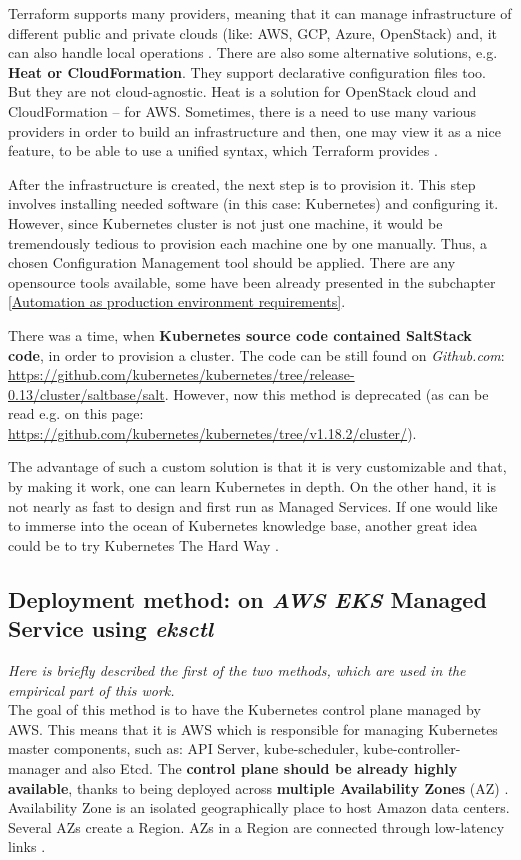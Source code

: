 Terraform supports many providers, meaning that it can manage infrastructure of different public and private clouds (like: AWS, GCP, Azure, OpenStack) and, it can also handle local operations \cite{terraform}. There are also some alternative solutions, e.g. \textbf{Heat or CloudFormation}. They support declarative configuration files too. But they are not cloud-agnostic. Heat is a solution for OpenStack cloud and CloudFormation -- for AWS. Sometimes, there is a need to use many various providers in order to build an infrastructure and then, one may view it as a nice feature, to be able to use a unified syntax, which Terraform provides \cite{terraform-vs}.

After the infrastructure is created, the next step is to provision it. This step involves installing needed software (in this case: Kubernetes) and configuring it. However, since Kubernetes cluster is not just one machine, it would be tremendously tedious to provision each machine one by one manually. Thus, a chosen Configuration Management tool should be applied. There are any opensource tools available, some have been already presented in the subchapter \ref{Automation as production environment requirements}.

There was a time, when \textbf{Kubernetes source code contained SaltStack code}, in order to provision a cluster. The code can be still found on \textit{Github.com}: \url{https://github.com/kubernetes/kubernetes/tree/release-0.13/cluster/saltbase/salt}. However, now this method is deprecated (as can be read e.g. on this page: \url{https://github.com/kubernetes/kubernetes/tree/v1.18.2/cluster/}).

The advantage of such a custom solution is that it is very customizable and that, by making it work, one can learn Kubernetes in depth. On the other hand, it is not nearly as fast to design and first run as Managed Services. If one would like to immerse into the ocean of Kubernetes knowledge base, another great idea could be to try Kubernetes The Hard Way \cite{k8s-thw}.


\subsection{Deployment method: on \textit{AWS EKS} Managed Service using \textit{eksctl}}
\textit{Here is briefly described the first of the two methods, which are used in the empirical part of this work.}
\\

The goal of this method is to have the Kubernetes control plane managed by AWS. This means that it is AWS which is responsible for managing Kubernetes master components, such as: API Server, kube-scheduler, kube-controller-manager and also Etcd. The \textbf{control plane should be already highly available}, thanks to being deployed across \textbf{multiple Availability Zones} (AZ) \cite{what-is-eks}. Availability Zone is an isolated geographically place to host Amazon data centers. Several AZs create a Region. AZs in a Region are connected through low-latency links \cite{az}.

